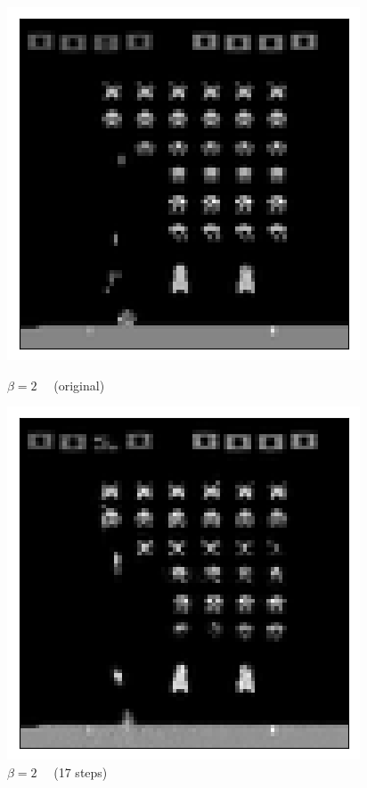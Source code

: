 \begin{figure}[h!]
\begin{multicols}{4}
    \includegraphics[scale=0.4]{figures/results/weighted_average/beta_2_posterior_sample_original.png}
    \caption{$\beta=2\quad$ (original)}
    \includegraphics[scale=0.4]{figures/results/weighted_average/beta_2_posterior_sample_17.png}
    \caption{$\beta=2\quad$ (17 steps)}

\end{multicols}
\end{figure}

